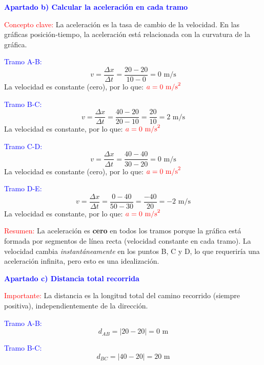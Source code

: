 \begin{exercise}
\begin{solu}
        \vspace{0.5cm}

        \textbf{\textcolor{blue}{Apartado b) Calcular la aceleración en cada tramo}}

        \textcolor{red}{Concepto clave:} La aceleración es la tasa de cambio de la velocidad. En las gráficas posición-tiempo, la aceleración está relacionada con la curvatura de la gráfica.

        \textcolor{blue}{Tramo A-B:}
        \[
            v = \frac{\Delta x}{\Delta t} = \frac{20 - 20}{10 - 0} = 0 \text{ m/s}
        \]
        La velocidad es constante (cero), por lo que: $\textcolor{red}{a = 0 \text{ m/s}^2}$

        \textcolor{blue}{Tramo B-C:}
        \[
            v = \frac{\Delta x}{\Delta t} = \frac{40 - 20}{20 - 10} = \frac{20}{10} = 2 \text{ m/s}
        \]
        La velocidad es constante, por lo que: $\textcolor{red}{a = 0 \text{ m/s}^2}$

        \textcolor{blue}{Tramo C-D:}
        \[
            v = \frac{\Delta x}{\Delta t} = \frac{40 - 40}{30 - 20} = 0 \text{ m/s}
        \]
        La velocidad es constante (cero), por lo que: $\textcolor{red}{a = 0 \text{ m/s}^2}$

        \textcolor{blue}{Tramo D-E:}
        \[
            v = \frac{\Delta x}{\Delta t} = \frac{0 - 40}{50 - 30} = \frac{-40}{20} = -2 \text{ m/s}
        \]
        La velocidad es constante, por lo que: $\textcolor{red}{a = 0 \text{ m/s}^2}$

        \textcolor{red}{Resumen:} La aceleración es \textbf{cero} en todos los tramos porque la gráfica está formada por segmentos de línea recta (velocidad constante en cada tramo). La velocidad cambia \textit{instantáneamente} en los puntos B, C y D, lo que requeriría una aceleración infinita, pero esto es una idealización.

        \vspace{0.5cm}

        \textbf{\textcolor{blue}{Apartado c) Distancia total recorrida}}

        \textcolor{red}{Importante:} La distancia es la longitud total del camino recorrido (siempre positiva), independientemente de la dirección.

        \textcolor{blue}{Tramo A-B:}
        \[
            d_{AB} = |20 - 20| = 0 \text{ m}
        \]

        \textcolor{blue}{Tramo B-C:}
        \[
            d_{BC} = |40 - 20| = 20 \text{ m}
        \]


\end{solu}
\end{exercise}
